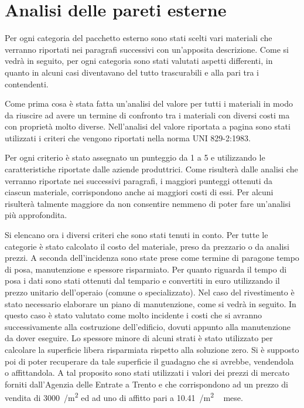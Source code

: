 \chapter{Analisi delle pareti esterne}\label{par:due}
Per ogni categoria del pacchetto esterno sono stati scelti vari materiali che verranno riportati nei paragrafi successivi con un'apposita descrizione.  
Come si vedrà in seguito, per ogni categoria sono stati valutati aspetti differenti, in quanto in alcuni casi diventavano del tutto trascurabili e alla pari tra i contendenti.

Come prima cosa è stata fatta un'analisi del valore per tutti i materiali in modo da riuscire ad avere un termine di confronto tra i materiali con diversi costi ma con proprietà molto diverse. 
Nell'analisi del valore riportata a pagina \pageref{fig:AnalisiValore} sono stati utilizzati i criteri che vengono riportati nella norma \textsc{UNI 829-2:1983}.

Per ogni criterio è stato assegnato un punteggio da 1 a 5  e utilizzando le caratteristiche riportate dalle aziende produttrici. 
Come risulterà dalle analisi che verranno riportate nei successivi paragrafi, i maggiori punteggi ottenuti da ciascun materiale, corrispondono anche ai maggiori costi di essi.
Per alcuni risulterà talmente maggiore da non consentire nemmeno di poter fare un'analisi più approfondita.

Si elencano ora i diversi criteri che sono stati tenuti in conto.
Per tutte le categorie è stato calcolato il costo del materiale, preso da prezzario o da analisi prezzi.
A seconda dell'incidenza sono state prese come termine di paragone tempo di posa, manutenzione e spessore risparmiato.
Per quanto riguarda il tempo di posa i dati sono stati ottenuti dal tempario \textcite{grosso2007tempario} e convertiti in euro utilizzando il prezzo unitario dell'operaio (comune o specializzato). 
Nel caso del rivestimento è stato necessario elaborare un piano di manutenzione, come si vedrà in seguito. 
In questo caso è stato valutato come molto incidente i costi che si avranno successivamente alla costruzione dell'edificio, dovuti appunto alla manutenzione da dover eseguire.
Lo spessore minore di alcuni strati è stato utilizzato per calcolare la superficie libera risparmiata rispetto alla soluzione zero. 
Si è supposto poi di poter recuperare da tale superficie il guadagno che si avrebbe, vendendola o affittandola.
A tal proposito sono stati utilizzati i valori dei prezzi di mercato forniti dall'Agenzia delle Entrate a Trento e che corrispondono ad un  prezzo di vendita di \SI{3000}{\teuro / \square\metre} ed ad uno di affitto pari a \SI{10.41}{\teuro /\square\metre\, mese}.